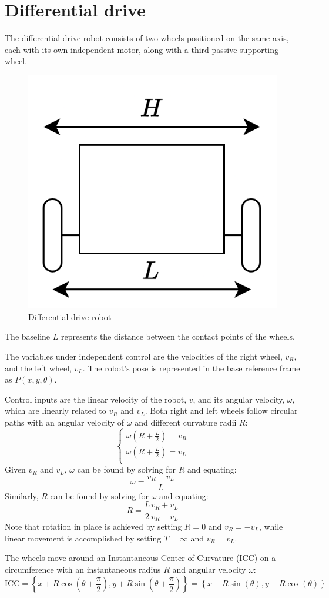 \section{Differential drive}

The differential drive robot consists of two wheels positioned on the same axis, each with its own independent motor, along with a third passive supporting wheel.
\begin{figure}[H]
    \centering
    \includegraphics[width=0.25\linewidth]{images/ddk.png} 
    \caption{Differential drive robot}
\end{figure}
The baseline $L$ represents the distance between the contact points of the wheels.

The variables under independent control are the velocities of the right wheel, $v_R$, and the left wheel, $v_L$. 
The robot's pose is represented in the base reference frame as $P(x, y, \theta)$.

Control inputs are the linear velocity of the robot, $v$, and its angular velocity, $\omega$, which are linearly related to $v_R$ and $v_L$. 
Both right and left wheels follow circular paths with an angular velocity of $\omega$ and different curvature radii $R$:
\[\begin{cases}
    \omega\left(R+\frac{L}{2}\right)=v_R \\
    \omega\left(R+\frac{L}{2}\right)=v_L \\
\end{cases}\]
Given $v_R$ and $v_L$, $\omega$ can be found by solving for $R$ and equating:
\[\omega =\dfrac{ v_R - v_L}{L}\]
Similarly, $R$ can be found by solving for $\omega$ and equating:
\[R=\dfrac{L}{2}\dfrac{v_R+v_L}{v_R-v_L}\]
Note that rotation in place is achieved by setting $R=0$ and $v_R=-v_L$, while linear movement is accomplished by setting $T=\infty$ and $v_R=v_L$.

The wheels move around an Instantaneous Center of Curvature (ICC) on a circumference with an instantaneous radius $R$ and angular velocity $\omega$:
\[\text{ICC}=\left\{ x+R\cos\left(\theta+\dfrac{\pi}{2}\right), y+R\sin\left(\theta+\dfrac{\pi}{2}\right) \right\}=\left\{ x-R\sin\left(\theta\right), y+R\cos\left(\theta\right) \right\}\]

